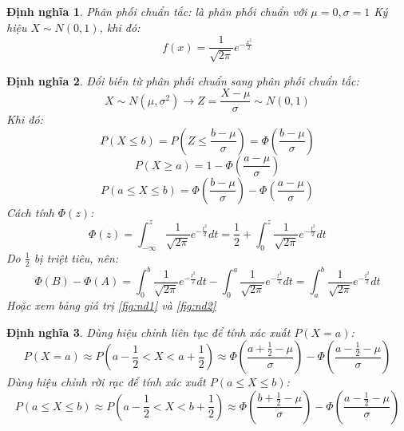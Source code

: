 \documentclass[12pt]{article}
\newtheorem{thm}{Định nghĩa}
\begin{document}
\begin{thm}
    Phân phối chuẩn tắc: là phân phối chuẩn với $\mu = 0, \sigma = 1$ Ký hiệu $X \sim N(0, 1)$, khi đó:
    \begin{equation}
        f(x) = \frac{1}{\sqrt{2\pi}}e^{-\frac{x^2}{2}}
    \end{equation}
\end{thm}
\begin{thm}
    Đổi biến từ phân phối chuẩn sang phân phối chuẩn tắc:
    \begin{equation}
        X \sim N(\mu, \sigma^2) \rightarrow Z = \frac{X - \mu}{\sigma} \sim N(0, 1)
    \end{equation}
    Khi đó:
    \begin{equation}
        P(X \leq b) = P(Z \leq \frac{b - \mu}{\sigma}) = \Phi(\frac{b - \mu}{\sigma})
    \end{equation}
    \begin{equation}
        P(X \geq a) = 1 - \Phi(\frac{a - \mu}{\sigma})
    \end{equation}
    \begin{equation}
        P(a \leq X \leq b) = \Phi(\frac{b - \mu}{\sigma}) - \Phi(\frac{a - \mu}{\sigma})
    \end{equation}
    Cách tính $\Phi(z)$:
    \begin{equation}
        \Phi(z) = \int_{-\infty}^z \frac{1}{\sqrt{2\pi}}e^{-\frac{t^2}{2}}dt = \frac{1}{2} + \int_{0}^z \frac{1}{\sqrt{2\pi}}e^{-\frac{t^2}{2}}dt
    \end{equation}
    Do $\frac{1}{2}$ bị triệt tiêu, nên:
    \begin{equation}
        \Phi(B) - \Phi(A) = \int_{0}^b \frac{1}{\sqrt{2\pi}}e^{-\frac{t^2}{2}}dt - \int_{0}^a \frac{1}{\sqrt{2\pi}}e^{-\frac{t^2}{2}}dt = \int_{a}^b \frac{1}{\sqrt{2\pi}}e^{-\frac{t^2}{2}}dt
    \end{equation}
    Hoặc xem bảng giá trị \ref{fig:nd1} và \ref{fig:nd2}
\end{thm}

\begin{thm}
    Dùng hiệu chỉnh liên tục để tính xác xuất $P(X =a)$:
    \begin{equation}
        P(X = a) \approx P(a - \frac{1}{2} < X < a + \frac{1}{2}) \approx \Phi(\frac{a + \frac{1}{2} - \mu}{\sigma}) - \Phi(\frac{a - \frac{1}{2} - \mu}{\sigma})
    \end{equation}
    Dùng hiệu chỉnh rời rạc để tính xác xuất $P( a \leq X \leq b)$:
    \begin{equation}
        P(a \leq X \leq b) \approx P(a - \frac{1}{2} < X < b + \frac{1}{2}) \approx \Phi(\frac{b + \frac{1}{2} - \mu}{\sigma}) - \Phi(\frac{a - \frac{1}{2} - \mu}{\sigma})
    \end{equation}

\end{thm}
\end{document}
